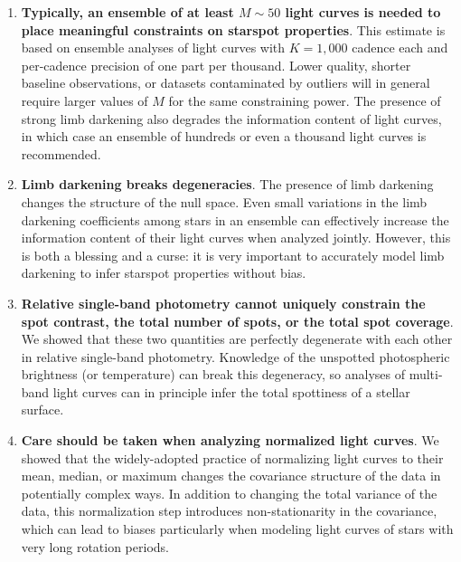 \documentclass[modern]{aastex62}
\begin{document}
\begin{enumerate}
    \item \textbf{Typically, an ensemble of at least $M \sim 50$ light curves
              is needed to place meaningful constraints on starspot properties}.
          This estimate is based on ensemble analyses of light curves with
          $K = 1{,}000$ cadence each and per-cadence precision of one part
          per thousand. Lower quality, shorter baseline observations, or
          datasets contaminated by outliers will in general require larger values
          of $M$ for the same constraining power. The presence of strong limb
          darkening also degrades the information content of light curves, in
          which case an ensemble of hundreds or even a thousand light curves
          is recommended.
    \item \textbf{Limb darkening breaks degeneracies}. The presence of limb darkening
          changes the structure of the null space. Even small variations in the
          limb darkening coefficients among stars in an ensemble can effectively
          increase the information content of their light curves when analyzed
          jointly. However, this is both a blessing and a curse: it is very
          important to accurately model limb darkening to infer starspot
          properties without bias.
    \item \textbf{Relative single-band photometry cannot uniquely constrain
              the spot contrast, the total number of spots, or the total spot
              coverage}. We showed that these two quantities
          are perfectly degenerate with each other in relative single-band photometry.
          Knowledge of the
          unspotted photospheric brightness (or temperature) can break this
          degeneracy, so analyses of multi-band light curves can in principle
          infer the total spottiness of a stellar surface.
    \item \textbf{Care should be taken when analyzing normalized light curves}.
          We showed that the widely-adopted practice of normalizing light curves
          to their mean, median, or maximum changes the covariance structure of
          the data in potentially complex ways. In addition to changing the total
          variance of the data, this normalization step introduces non-stationarity
          in the covariance, which can lead to biases particularly when
          modeling light curves of stars with very long rotation periods.
\end{enumerate}
\end{document}
